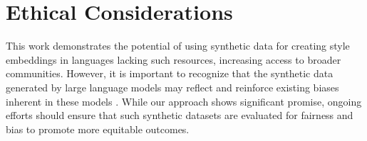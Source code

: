 \section * {Ethical Considerations}

This work demonstrates the potential of using synthetic data for creating style embeddings in languages lacking such resources, increasing access to broader communities. However, it is important to recognize that the synthetic data generated by large language models may reflect and reinforce existing biases inherent in these models \citep{lisa}. While our approach shows significant promise, ongoing efforts should ensure that such synthetic datasets are evaluated for fairness and bias to promote more equitable outcomes.